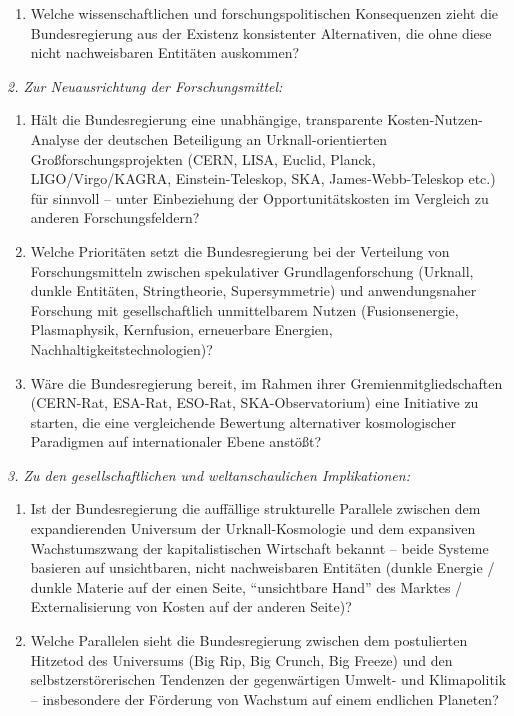 \documentclass[11pt,a4paper]{letter}
\begin{document}
\begin{letter}
\begin{enumerate}
    \item Welche wissenschaftlichen und forschungspolitischen Konsequenzen zieht die Bundesregierung aus der Existenz konsistenter Alternativen, die ohne diese nicht nachweisbaren Entitäten auskommen?
\end{enumerate}

\noindent
\textit{2. Zur Neuausrichtung der Forschungsmittel:}

\begin{enumerate}
    \item Hält die Bundesregierung eine unabhängige, transparente Kosten-Nutzen-Analyse der deutschen Beteiligung an Urknall-orientierten Großforschungsprojekten (CERN, LISA, Euclid, Planck, LIGO/Virgo/KAGRA, Einstein-Teleskop, SKA, James-Webb-Teleskop etc.) für sinnvoll – unter Einbeziehung der Opportunitätskosten im Vergleich zu anderen Forschungsfeldern?
    
    \item Welche Prioritäten setzt die Bundesregierung bei der Verteilung von Forschungsmitteln zwischen spekulativer Grundlagenforschung (Urknall, dunkle Entitäten, Stringtheorie, Supersymmetrie) und anwendungsnaher Forschung mit gesellschaftlich unmittelbarem Nutzen (Fusionsenergie, Plasmaphysik, Kernfusion, erneuerbare Energien, Nachhaltigkeitstechnologien)?
    
    \item Wäre die Bundesregierung bereit, im Rahmen ihrer Gremienmitgliedschaften (CERN-Rat, ESA-Rat, ESO-Rat, SKA-Observatorium) eine Initiative zu starten, die eine vergleichende Bewertung alternativer kosmologischer Paradigmen auf internationaler Ebene anstößt?
\end{enumerate}

\noindent
\textit{3. Zu den gesellschaftlichen und weltanschaulichen Implikationen:}

\begin{enumerate}
    \item Ist der Bundesregierung die auffällige strukturelle Parallele zwischen dem expandierenden Universum der Urknall-Kosmologie und dem expansiven Wachstumszwang der kapitalistischen Wirtschaft bekannt – beide Systeme basieren auf unsichtbaren, nicht nachweisbaren Entitäten (dunkle Energie / dunkle Materie auf der einen Seite, \enquote{unsichtbare Hand} des Marktes / Externalisierung von Kosten auf der anderen Seite)?
    
    \item Welche Parallelen sieht die Bundesregierung zwischen dem postulierten Hitzetod des Universums (Big Rip, Big Crunch, Big Freeze) und den selbstzerstörerischen Tendenzen der gegenwärtigen Umwelt- und Klimapolitik – insbesondere der Förderung von Wachstum auf einem endlichen Planeten?
    

\end{enumerate}
\end{letter}
\end{document}
